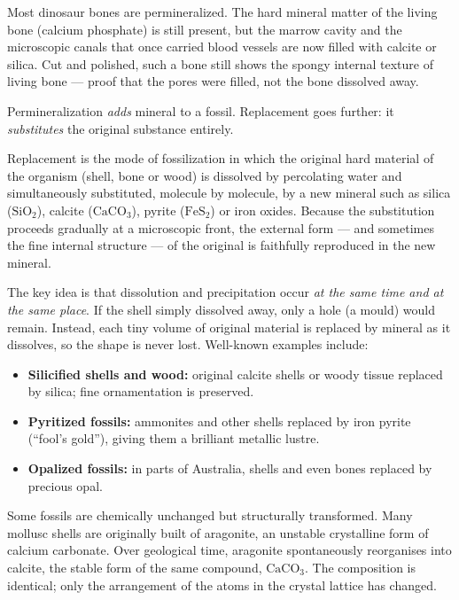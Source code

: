 \documentclass[11pt]{article}
\newcommand{\cle}[1]{{\popxbold\color{popdark}#1}}
\newcounter{popsec}
\newcounter{popsub}
\newcommand{\courssub}[1]{%
  \stepcounter{popsub}%
  \par\vspace{9pt}\noindent{\popxbold\fontsize{11.5}{13}\selectfont\color{popink}{\color{poporange}\thepopsec.\thepopsub}\hspace{6pt}#1}\par\nopagebreak\vspace{4pt}
}
\begin{document}
\begin{exemplebox}
Most dinosaur bones are permineralized. The hard mineral matter of the living bone (calcium phosphate) is still present, but the marrow cavity and the microscopic canals that once carried blood vessels are now filled with calcite or silica. Cut and polished, such a bone still shows the spongy internal texture of living bone --- proof that the pores were filled, not the bone dissolved away.
\end{exemplebox}

\courssub{Replacement}

Permineralization \emph{adds} mineral to a fossil. \cle{Replacement} goes further: it \emph{substitutes} the original substance entirely.

\begin{definition}[Replacement]
\cle{Replacement} is the mode of fossilization in which the original hard material of the organism (shell, bone or wood) is dissolved by percolating water and simultaneously substituted, molecule by molecule, by a new mineral such as silica ($\mathrm{SiO_2}$), calcite ($\mathrm{CaCO_3}$), pyrite ($\mathrm{FeS_2}$) or iron oxides. Because the substitution proceeds gradually at a microscopic front, the external form --- and sometimes the fine internal structure --- of the original is faithfully reproduced in the new mineral.
\end{definition}

The key idea is that dissolution and precipitation occur \emph{at the same time and at the same place}. If the shell simply dissolved away, only a hole (a mould) would remain. Instead, each tiny volume of original material is replaced by mineral as it dissolves, so the shape is never lost. Well-known examples include:

\begin{itemize}
\item \textbf{Silicified shells and wood:} original calcite shells or woody tissue replaced by silica; fine ornamentation is preserved.
\item \textbf{Pyritized fossils:} ammonites and other shells replaced by iron pyrite (``fool's gold''), giving them a brilliant metallic lustre.
\item \textbf{Opalized fossils:} in parts of Australia, shells and even bones replaced by precious opal.
\end{itemize}

\courssub{Recrystallization}

Some fossils are chemically unchanged but structurally transformed. Many mollusc shells are originally built of \cle{aragonite}, an unstable crystalline form of calcium carbonate. Over geological time, aragonite spontaneously reorganises into \cle{calcite}, the stable form of the same compound, $\mathrm{CaCO_3}$. The composition is identical; only the arrangement of the atoms in the crystal lattice has changed.
\end{document}
